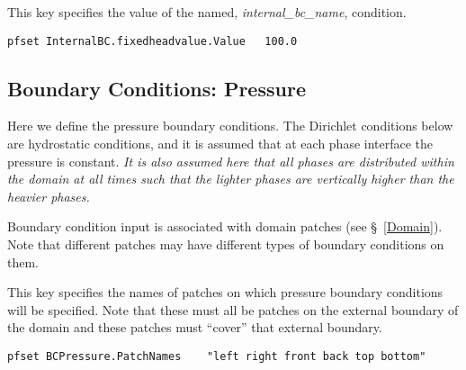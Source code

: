 {
This key specifies the value of the named,
{\em internal\_bc\_name}, condition.
}
\begin{display}\begin{verbatim}
pfset InternalBC.fixedheadvalue.Value   100.0
\end{verbatim}\end{display}


\subsection{Boundary Conditions: Pressure}
\label{Boundary Conditions: Pressure}

Here we define the pressure boundary conditions.
The Dirichlet conditions below are hydrostatic conditions, and it
is assumed that at each phase interface the pressure is constant.
{\em It is also assumed here that all phases
are distributed within the domain at all times such that the lighter phases
are vertically higher than the heavier phases.}

Boundary condition input is associated with domain patches
(see \S~\ref{Domain}).  Note that different patches may have different types of
boundary conditions on them.


{This key specifies the names of patches on which pressure boundary conditions
will be specified.  Note that these must all be patches on the external
boundary of the domain and these patches must ``cover'' that external boundary.
}
\begin{display}\begin{verbatim}
pfset BCPressure.PatchNames    "left right front back top bottom"
\end{verbatim}\end{display}

